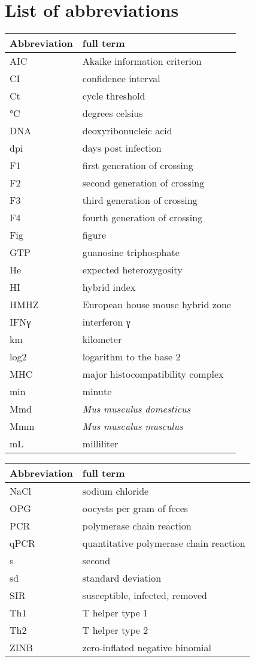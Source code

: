 \documentclass[11pt]{report}
\numberwithin{equation}{section} %
\begin{document}

\clearpage

\clearpage


\tableofcontents

\chapter*{List of abbreviations}
\begin{tabular}{l l}
Abbreviation & full term \\
\hline
AIC & Akaike information criterion \\
CI & confidence interval \\
Ct & cycle threshold \\
°C & degrees celsius \\
DNA & deoxyribonucleic acid \\
dpi & days post infection \\
F1 & first generation of crossing \\
F2 & second generation of crossing \\
F3 & third generation of crossing \\
F4 & fourth generation of crossing \\
Fig & figure \\
GTP & guanosine triphosphate \\
He & expected heterozygosity \\
HI & hybrid index \\
HMHZ   & European house mouse hybrid zone \\
IFNγ & interferon γ \\
km & kilometer \\
log2 & logarithm to the base 2 \\
MHC & major histocompatibility complex \\
min & minute \\
Mmd & \textit{Mus musculus domesticus} \\
Mmm    & \textit{Mus musculus musculus}  \\
mL & milliliter
\end{tabular}

\newpage

\begin{tabular}{l l}
Abbreviation & full term \\
\hline
NaCl & sodium chloride \\
OPG & oocysts per gram of feces \\
PCR & polymerase chain reaction \\
qPCR & quantitative polymerase chain reaction \\
s & second \\
sd & standard deviation \\
SIR & susceptible, infected, removed \\
Th1 & T helper type 1 \\
Th2 & T helper type 2 \\
ZINB &  zero-inflated negative binomial
\end{tabular}
\end{document}
